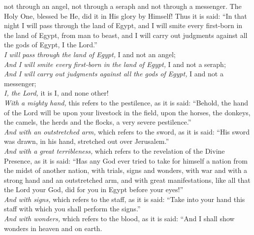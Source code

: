 \documentclass[letter,11pt,openany]{memoir}
\begin{document}
\vspace{-1em} {\small 
{} not through an angel, not through a seraph and not through a messenger. The Holy One, blessed be He, did it in His glory by Himself! Thus it is said: ``In that night I will pass through the land of Egypt, and I will smite every first-born in the land of Egypt, from man to beast, and I will carry out judgments against all the gods of Egypt, I the Lord.''\\[.5em]
\phantom{MM} {\itshape I will pass through the land of Egypt,} I and not an angel;\\[.4em]
\phantom{MM} {\itshape And I will smite every first-born in the land of Egypt,} I and not a seraph;\\[.4em]
\phantom{MM} {\itshape And I will carry out judgments against all the gods of Egypt,} I and not a messenger;\\[.4em]
\phantom{MM} {\itshape I, the Lord,} it is I, and none other!\\[1em]
{\itshape With a mighty hand,} this refers to the pestilence, as it is said: ``Behold, the hand of the Lord will be upon your livestock in the field, upon the horses, the donkeys, the camels, the herds and the flocks, a very severe pestilence.'' \\[1em]
{\itshape And with an outstretched arm,} which refers to the sword, as it is said: ``His sword was drawn, in his hand, stretched out over Jerusalem.'' \\[1em]
{\itshape And with a great terribleness,} which refers to the revelation of the Divine Presence, as it is said: ``Has any God ever tried to take for himself a nation from the midst of another nation, with trials, signs and wonders, with war and with a strong hand and an outstretched arm, and with great manifestations, like all that the Lord your God, did for you in Egypt before your eyes!'' \\[1em]
{\itshape And with signs,} which refers to the staff, as it is said: ``Take into your hand this staff with which you shall perform the signs.'' \\[1em]
{\itshape And with wonders,} which refers to the blood, as it is said: ``And I shall show wonders in heaven and on earth.}
\end{document}
